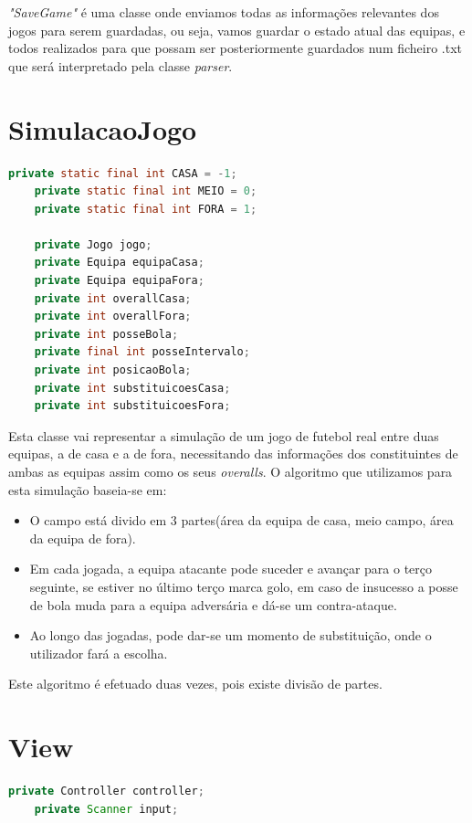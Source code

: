\documentclass[a4paper]{report}
\begin{document}
	\emph{"SaveGame"} é uma classe onde enviamos todas as informações relevantes dos jogos para serem guardadas, ou seja, vamos guardar o estado atual das equipas, e todos realizados para que possam ser posteriormente guardados num ficheiro .txt que será interpretado pela classe \emph{parser}.
    
     	\newpage
     	
	\section{SimulacaoJogo}
	\begin{lstlisting}[language=Java]
    private static final int CASA = -1;
    private static final int MEIO = 0;
    private static final int FORA = 1;

    private Jogo jogo;
    private Equipa equipaCasa;
    private Equipa equipaFora;
    private int overallCasa;
    private int overallFora;
    private int posseBola;
    private final int posseIntervalo;
    private int posicaoBola;
    private int substituicoesCasa;
    private int substituicoesFora;
	\end{lstlisting}
	
	Esta classe vai representar a simulação de um jogo de futebol real entre duas equipas, a de casa e a de fora, necessitando das informações dos constituintes de ambas as equipas assim como os seus \emph{overalls}. O algoritmo que utilizamos para esta simulação baseia-se em:
	\begin{itemize}
        \item O campo está divido em 3 partes(área da equipa de casa, meio campo, área da equipa de fora).
        \item Em cada jogada, a equipa atacante pode suceder e avançar para o terço seguinte, se estiver no último terço marca golo, em caso de insucesso a posse de bola muda para a equipa adversária e dá-se um contra-ataque.
        \item Ao longo das jogadas, pode dar-se um momento de substituição, onde o utilizador fará a escolha.
    \end{itemize}
	 Este algoritmo é efetuado duas vezes, pois existe divisão de partes.
	
\newpage
	
	\section{View}
	\begin{lstlisting}[language=Java]
    private Controller controller;
    private Scanner input;
	\end{lstlisting}
	
\end{document}
